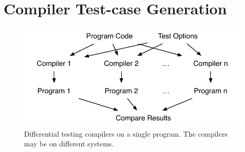 \section{Compiler Test-case Generation}\label{sec:motivation}

\begin{figure}
	\centering
	\includegraphics[width=.9\columnwidth]{img/difftest} %
	\caption{%
		Differential testing compilers on a single program. The compilers may be on different systems.%
	}%
	\label{fig:deeptune}
\end{figure}


